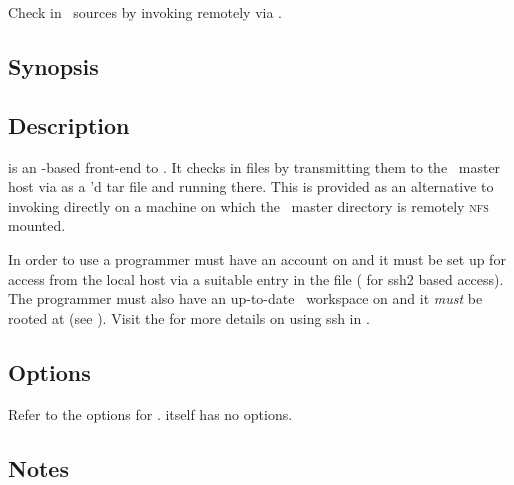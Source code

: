 Check in \aipspp\ sources by invoking  remotely via .

\subsection*{Synopsis}
 
\begin{synopsis}
\end{synopsis}
 
\subsection*{Description}
 
 is an -based front-end to .  It checks in
files by transmitting them to the \aipspp\ master host via  as a
'd tar file and running  there.  This is provided as
an alternative to invoking  directly on a machine on which the
\aipspp\ master directory is remotely \textsc{nfs} mounted.

In order to use  a programmer must have an account on
 and it must be set up for  access from the
local host via a suitable entry in the  file
( for ssh2 based access).
The programmer
must also have an up-to-date \aipspp\ workspace on  and
it \emph{must} be  rooted at  (see ).
Visit the 
for more details on using ssh in \aipspp.

\subsection*{Options}
 
Refer to the options for .   itself has no options.

\subsection*{Notes}
 
